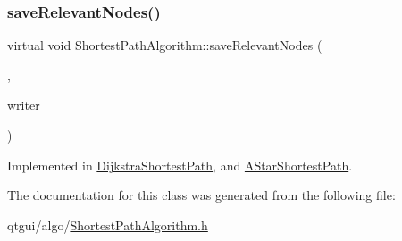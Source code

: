 \subsubsection{\texorpdfstring{saveRelevantNodes()}{saveRelevantNodes()}}
{\footnotesize\ttfamily virtual void Shortest\+Path\+Algorithm\+::save\+Relevant\+Nodes (\begin{DoxyParamCaption}\item[{const Q\+List$<$ std\+::shared\+\_\+ptr$<$ \mbox{\hyperlink{class_node_data}{Node\+Data}} $>$ $>$ \&}]{,  }\item[{std\+::function$<$ void(\mbox{\hyperlink{classtypes_1_1_node_id}{types\+::\+Node\+Id}}, \mbox{\hyperlink{classtypes_1_1_node_id}{types\+::\+Node\+Id}}, double)$>$}]{writer }\end{DoxyParamCaption})\hspace{0.3cm}{\ttfamily [pure virtual]}}



Implemented in \mbox{\hyperlink{class_dijkstra_shortest_path_a9520d7dadce62855b5bbf6d4711f9d3f}{Dijkstra\+Shortest\+Path}}, and \mbox{\hyperlink{class_a_star_shortest_path_ac75bc0ce3b80510e0f3170cb717c620c}{A\+Star\+Shortest\+Path}}.



The documentation for this class was generated from the following file\+:\begin{DoxyCompactItemize}
\item 
qtgui/algo/\mbox{\hyperlink{_shortest_path_algorithm_8h}{Shortest\+Path\+Algorithm.\+h}}\end{DoxyCompactItemize}
